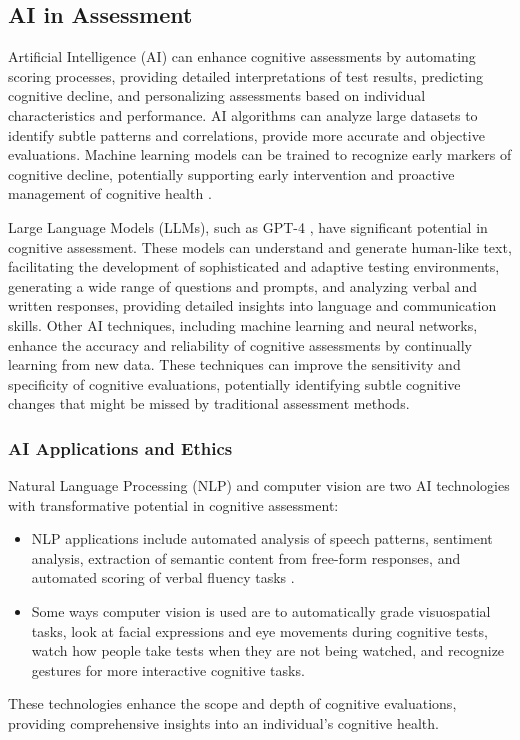 \subsection{AI in Assessment}
Artificial Intelligence (AI) can enhance cognitive assessments by automating scoring processes, providing detailed interpretations of test results, predicting cognitive decline, and personalizing assessments based on individual characteristics and performance. AI algorithms can analyze large datasets to identify subtle patterns and correlations, provide more accurate and objective evaluations. Machine learning models can be trained to recognize early markers of cognitive decline, potentially supporting early intervention and proactive management of cognitive health \cite{Rabinowitz2019}.

Large Language Models (LLMs), such as GPT-4 \cite{Openai2023gpt4}, have significant potential in cognitive assessment. These models can understand and generate human-like text, facilitating the development of sophisticated and adaptive testing environments, generating a wide range of questions and prompts, and analyzing verbal and written responses, providing detailed insights into language and communication skills. Other AI techniques, including machine learning and neural networks, enhance the accuracy and reliability of cognitive assessments by continually learning from new data. These techniques can improve the sensitivity and specificity of cognitive evaluations, potentially identifying subtle cognitive changes that might be missed by traditional assessment methods.

\subsubsection{AI Applications and Ethics}
Natural Language Processing (NLP) and computer vision are two AI technologies with transformative potential in cognitive assessment:
\begin{itemize}
    \item NLP applications include automated analysis of speech patterns, sentiment analysis, extraction of semantic content from free-form responses, and automated scoring of verbal fluency tasks \cite{Weiner2016}.
    \item Some ways computer vision is used are to automatically grade visuospatial tasks, look at facial expressions and eye movements during cognitive tests, watch how people take tests when they are not being watched, and recognize gestures for more interactive cognitive tasks.
\end{itemize}
These technologies enhance the scope and depth of cognitive evaluations, providing comprehensive insights into an individual's cognitive health.

